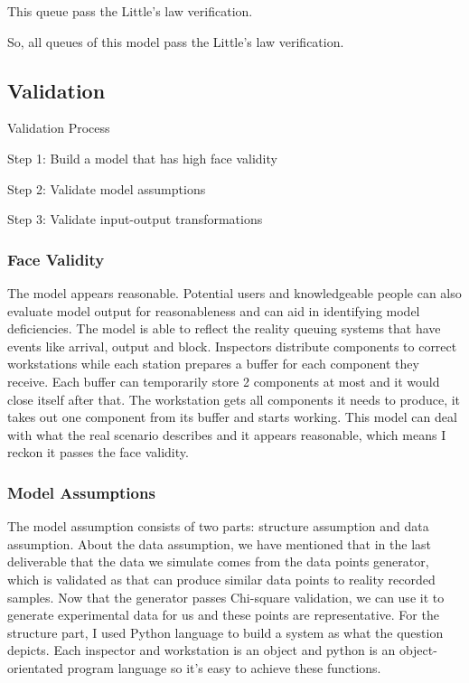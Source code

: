 \documentclass{article}
\begin{document}
This queue pass the Little's law verification.

So, all queues of this model pass the Little's law verification.

\subsection{Validation}

Validation Process

Step 1: Build a model that has high face validity

Step 2: Validate model assumptions

Step 3: Validate input-output transformations

\subsubsection{Face Validity}

The model appears reasonable. Potential users and knowledgeable people can also evaluate model output for reasonableness and can aid in identifying model deficiencies. The model is able to reflect the reality queuing systems that have events like arrival, output and block. Inspectors distribute components to correct workstations while each station prepares a buffer for each component they receive. Each buffer can temporarily store 2 components at most and it would close itself after that. The workstation gets all components it needs to produce, it takes out one component from its buffer and starts working. This model can deal with what the real scenario describes and it appears reasonable, which means I reckon it passes the face validity. 


\subsubsection{Model Assumptions}

The model assumption consists of two parts: structure assumption and data assumption. About the data assumption, we have mentioned that in the last deliverable that the data we simulate comes from the data points generator, which is validated as that can produce similar data points to reality recorded samples. Now that the generator passes Chi-square validation, we can use it to generate experimental data for us and these points are representative. For the structure part, I used Python language to build a system as what the question depicts. Each inspector and workstation is an object and python is an object-orientated program language so it's easy to achieve these functions.
\end{document}

